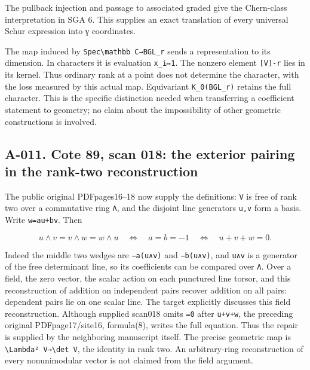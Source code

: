 \documentclass[
  10pt,
]{article}
\begin{document}
The pullback injection and passage to associated graded give the
Chern-class interpretation in SGA 6. This supplies an exact translation
of every universal Schur expression into γ coordinates.

The map induced by
\texttt{\small Spec\textbackslash{}mathbb C→\allowbreak{}BGL\_\allowbreak{}r}
sends a representation to its dimension. In characters it is evaluation
\texttt{\small x\_\allowbreak{}i↦1}. The nonzero element
\texttt{\small [\allowbreak{}V]\allowbreak{}-\allowbreak{}r} lies in its
kernel. Thus ordinary rank at a point does not determine the character,
with the loss measured by this actual map. Equivariant
\texttt{\small K\_\allowbreak{}0(\allowbreak{}BGL\_\allowbreak{}r)\allowbreak{}}
retains the full character. This is the specific distinction needed when
transferring a coefficient statement to geometry; no claim about the
impossibility of other geometric constructions is involved.

\subsection{A-011. Cote 89, scan 018: the exterior pairing in the
rank-two
reconstruction}\label{a-011.-cote-89-scan-018-the-exterior-pairing-in-the-rank-two-reconstruction}

The public original PDFpages16--18 now supply the definitions:
\texttt{\small V} is free of rank two over a commutative ring
\texttt{\small Λ}, and the disjoint line generators
\texttt{\small u,\allowbreak{}v} form a basis. Write
\texttt{\small w=\allowbreak{}au+\allowbreak{}bv}. Then

\[
u\wedge v=v\wedge w=w\wedge u
\quad\Longleftrightarrow\quad a=b=-1
\quad\Longleftrightarrow\quad u+v+w=0.
\]

Indeed the middle two wedges are
\texttt{\small −a(\allowbreak{}u∧v)\allowbreak{}} and
\texttt{\small −b(\allowbreak{}u∧v)\allowbreak{}}, and
\texttt{\small u∧v} is a generator of the free determinant line, so its
coefficients can be compared over \texttt{\small Λ}. Over a field, the
zero vector, the scalar action on each punctured line torsor, and this
reconstruction of addition on independent pairs recover addition on all
pairs: dependent pairs lie on one scalar line. The target explicitly
discusses this field reconstruction. Although supplied scan018 omits
\texttt{\small =\allowbreak{}0} after
\texttt{\small u+\allowbreak{}v+\allowbreak{}w}, the preceding original
PDFpage17/site16, formula(8), writes the full equation. Thus the repair
is supplied by the neighboring manuscript itself. The precise geometric
map is
\texttt{\small \textbackslash{}Lambda² V→\allowbreak{}\textbackslash{}det V},
the identity in rank two. An arbitrary-ring reconstruction of every
nonunimodular vector is not claimed from the field argument.
\end{document}
